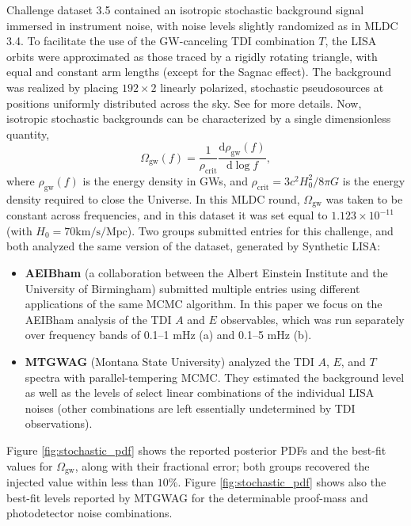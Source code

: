 \documentclass{iopart}
\begin{document}
Challenge dataset 3.5 contained an isotropic stochastic background signal immersed in instrument noise, with noise levels slightly randomized as in MLDC 3.4.
To facilitate the use of the GW-canceling TDI combination $T$, 
the LISA orbits were approximated as those traced by a rigidly rotating
triangle, with equal and constant arm lengths (except for the Sagnac effect). The background was realized by placing $192 \times 2$ linearly polarized, stochastic pseudosources at positions uniformly distributed across the sky. See \cite{MLDC3} for more details. Now, isotropic stochastic backgrounds can be characterized by a single dimensionless quantity,
%
\begin{equation}
\Omega_{\mathrm{gw}}(f)=\frac{1}{\rho_{\mathrm{crit}}}\frac{\mathrm{d} \rho_{\mathrm{gw}}(f)}{\mathrm{d} \log{f}},
\end{equation}
%
where $\rho_{\mathrm{gw}}(f)$ is the energy density in GWs,
and $\rho_{\mathrm{crit}}=3c^2H_0^2/8\pi G$ is the energy density required
to close the Universe. In this MLDC round, $\Omega_{\mathrm{gw}}$ was taken to be constant across frequencies, and in this dataset it was set equal to $1.123 \times 10^{-11}$ (with $H_0=70 \mathrm{km}/\mathrm{s}/\mathrm{Mpc}$). Two groups submitted entries for this challenge, and both analyzed the same version of the dataset, generated by Synthetic LISA:
%
\begin{itemize}
\item \textbf{AEIBham} (a collaboration between the Albert Einstein Institute
and the University of Birmingham) submitted multiple entries using different applications of the same MCMC algorithm. In this paper we focus on the AEIBham analysis of the TDI $A$ and $E$ observables, which was run separately over frequency bands of 0.1--1 mHz (a) and 0.1--5 mHz (b).
\item \textbf{MTGWAG} (Montana State University) analyzed the TDI $A$, $E$, and $T$ spectra with parallel-tempering MCMC. They estimated the background level as well as the levels of select linear combinations of the individual LISA noises (other combinations are left essentially undetermined by TDI observations).
\end{itemize}
%
Figure \ref{fig:stochastic_pdf} shows the reported posterior PDFs and the best-fit values for $\Omega_{\mathrm{gw}}$, along with their fractional error; both groups recovered the injected value within less than $10\%$. Figure \ref{fig:stochastic_pdf} shows also the best-fit levels reported by MTGWAG for the determinable proof-mass and photodetector noise combinations.
\end{document}
